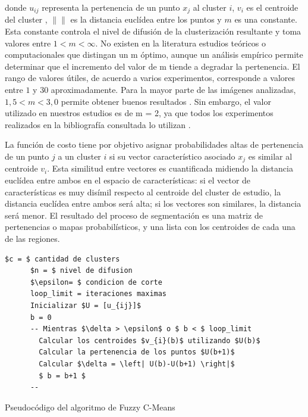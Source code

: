 donde $u_{ij}$ representa la pertenencia de un punto $x_j$ al cluster $i$, $v_i$ es el centroide del cluster , $\lVert \rVert$ es la distancia euclídea entre los puntos y $m$ es una constante. Esta constante controla el nivel de difusión de la clusterización resultante \citep{chuang2006fuzzy} y toma valores entre $1 < m < \infty$. No existen en la literatura estudios teóricos o computacionales que distingan un m óptimo, aunque un análisis empírico permite determinar que el incremento del valor de m tiende a degradar la pertenencia. El rango de valores útiles, de acuerdo a varios experimentos, corresponde a valores entre $1$ y $30$ aproximadamente. Para la mayor parte de las imágenes analizadas, $1,5 < m < 3,0$ permite obtener buenos resultados \citep{bezdek1984fcm}. Sin embargo, el valor utilizado en nuestros estudios es de m = 2, ya que todos los experimentos realizados en la bibliografía consultada lo utilizan \citep{caldairou2011non, yang2005fuzzy, chuang2006fuzzy}.

La función de costo tiene por objetivo asignar probabilidades altas de pertenencia de un punto $j$ a un cluster $i$ si su vector característico asociado $x_j$ es similar al centroide $v_i$. Esta similitud entre vectores es cuantificada midiendo la distancia euclídea entre ambos en el espacio de características: si el vector de características es muy disímil respecto al centroide del cluster de estudio, la distancia euclídea entre ambos será alta; si los vectores son similares, la distancia será menor. El resultado del proceso de segmentación es una matriz de pertenencias o mapas probabilísticos, y una lista con los centroides de cada una de las regiones.


\begin{program}[H]
	\begin{lstlisting}[mathescape]
	  $c = $ cantidad de clusters
	  $n = $ nivel de difusion
	  $\epsilon= $ condicion de corte
	  loop_limit = iteraciones maximas	  
	  Inicializar $U = [u_{ij}]$
	  b = 0
	  -- Mientras $\delta > \epsilon$ o $ b < $ loop_limit
	    Calcular los centroides $v_{i}(b)$ utilizando $U(b)$
	    Calcular la pertenencia de los puntos $U(b+1)$
	    Calcular $\delta = \left| U(b)-U(b+1) \right|$
	    $ b = b+1 $
	  --
	\end{lstlisting}
	\caption{Pseudocódigo del algoritmo de Fuzzy C-Means}
	\label{lst:fcm-alg}
\end{program}

